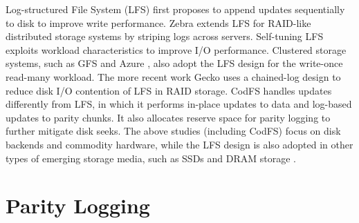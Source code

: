 Log-structured File System (LFS) \cite{rosenblum92} first proposes to append
updates sequentially to disk to improve write performance.  Zebra
\cite{hartman95} extends LFS for RAID-like distributed storage systems by
striping logs across servers.  Self-tuning LFS \cite{matthews97} exploits
workload characteristics to improve I/O performance.  Clustered storage
systems, such as GFS \cite{ghemawat03} and Azure \cite{calder11}, also adopt
the LFS design for the write-once read-many workload.  The more recent work
Gecko \cite{shin13} uses a chained-log design to reduce disk I/O contention of
LFS in RAID storage.  CodFS handles updates differently from LFS, in which it
performs in-place updates to data and log-based updates to parity chunks.  It
also allocates reserve space for parity logging to further mitigate disk
seeks.  The above studies (including CodFS) focus on disk backends and
commodity hardware, while the LFS design is also adopted in other types of
emerging storage media, such as SSDs \cite{agrawal08} and DRAM storage
\cite{ongaro11}.  



\section{Parity Logging}

